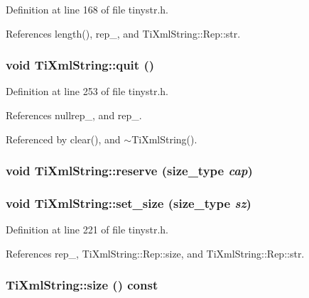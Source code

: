 Definition at line 168 of file tinystr.h.

References length(), rep\_\-, and TiXmlString::Rep::str.\hypertarget{class_ti_xml_string_aa6008ae51286a342cd366fbf1e3eeafc}{
\subsubsection[{quit}]{\setlength{\rightskip}{0pt plus 5cm}void TiXmlString::quit ()}}
\label{class_ti_xml_string_aa6008ae51286a342cd366fbf1e3eeafc}


Definition at line 253 of file tinystr.h.

References nullrep\_\-, and rep\_\-.

Referenced by clear(), and $\sim$TiXmlString().\hypertarget{class_ti_xml_string_a88ecf9f0f00cb5c67b6b637958d7049c}{
\subsubsection[{reserve}]{\setlength{\rightskip}{0pt plus 5cm}void TiXmlString::reserve ({\bf size\_\-type} {\em cap})}}
\label{class_ti_xml_string_a88ecf9f0f00cb5c67b6b637958d7049c}
\hypertarget{class_ti_xml_string_a5d70615367bf2920c25feddf6ac4ad30}{
\subsubsection[{set\_\-size}]{\setlength{\rightskip}{0pt plus 5cm}void TiXmlString::set\_\-size ({\bf size\_\-type} {\em sz})}}
\label{class_ti_xml_string_a5d70615367bf2920c25feddf6ac4ad30}


Definition at line 221 of file tinystr.h.

References rep\_\-, TiXmlString::Rep::size, and TiXmlString::Rep::str.\hypertarget{class_ti_xml_string_a96103e5c0f67e987fa48527e1f47a1f6}{
\subsubsection[{size}]{ TiXmlString::size () const}}
\label{class_ti_xml_string_a96103e5c0f67e987fa48527e1f47a1f6}


